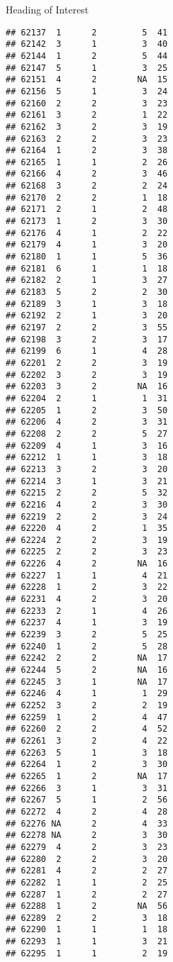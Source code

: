 \documentclass[
  ignorenonframetext,
]{beamer}
\begin{document}
\begin{frame}[fragile]{Heading of Interest}
\begin{verbatim}
## 62137  1      2         5  41
## 62142  3      1         3  40
## 62144  1      2         5  44
## 62147  5      1         3  25
## 62151  4      2        NA  15
## 62156  5      1         3  24
## 62160  2      2         3  23
## 62161  3      2         1  22
## 62162  3      2         3  19
## 62163  2      2         3  23
## 62164  1      2         3  38
## 62165  1      1         2  26
## 62166  4      2         3  46
## 62168  3      2         2  24
## 62170  2      2         1  18
## 62171  2      1         2  48
## 62173  1      2         3  30
## 62176  4      1         2  22
## 62179  4      1         3  20
## 62180  1      1         5  36
## 62181  6      1         1  18
## 62182  2      1         3  27
## 62183  5      2         2  30
## 62189  3      1         3  18
## 62192  2      1         3  20
## 62197  2      2         3  55
## 62198  3      2         3  17
## 62199  6      1         4  28
## 62201  2      2         3  19
## 62202  3      2         3  19
## 62203  3      2        NA  16
## 62204  2      1         1  31
## 62205  1      2         3  50
## 62206  4      2         3  31
## 62208  2      2         5  27
## 62209  4      1         3  16
## 62212  1      1         3  18
## 62213  3      2         3  20
## 62214  3      1         3  21
## 62215  2      2         5  32
## 62216  4      2         3  30
## 62219  2      2         3  24
## 62220  4      2         1  35
## 62224  2      2         3  19
## 62225  2      2         3  23
## 62226  4      2        NA  16
## 62227  1      1         4  21
## 62228  1      2         3  22
## 62231  4      2         3  20
## 62233  2      1         4  26
## 62237  4      1         3  19
## 62239  3      2         5  25
## 62240  1      2         5  28
## 62242  2      2        NA  17
## 62244  5      2        NA  16
## 62245  3      1        NA  17
## 62246  4      1         1  29
## 62252  3      2         2  19
## 62259  1      2         4  47
## 62260  2      2         4  52
## 62261  3      2         4  22
## 62263  5      1         3  18
## 62264  1      2         3  30
## 62265  1      2        NA  17
## 62266  3      1         3  31
## 62267  5      1         2  56
## 62272  4      2         4  28
## 62276 NA      2         4  33
## 62278 NA      2         3  30
## 62279  4      2         3  23
## 62280  2      2         3  20
## 62281  4      2         2  27
## 62282  1      1         2  25
## 62287  1      2         2  27
## 62288  1      2        NA  56
## 62289  2      2         3  18
## 62290  1      1         1  18
## 62293  1      1         3  21
## 62295  1      1         2  19

\end{verbatim}
\end{frame}
\end{document}
